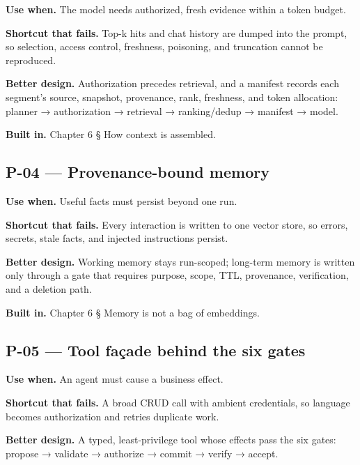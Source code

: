 \textbf{Use when.} The model needs authorized, fresh evidence within a token budget.\par

\textbf{Shortcut that fails.} Top-k hits and chat history are dumped into the prompt, so selection, access control, freshness, poisoning, and truncation cannot be reproduced.\par

\textbf{Better design.} Authorization precedes retrieval, and a manifest records each segment's source, snapshot, provenance, rank, freshness, and token allocation: planner → authorization → retrieval → ranking/dedup → manifest → model.\par

\textbf{Built in.} Chapter 6 § How context is assembled.\par

\subsection{P-04 — Provenance-bound memory}

\textbf{Use when.} Useful facts must persist beyond one run.\par

\textbf{Shortcut that fails.} Every interaction is written to one vector store, so errors, secrets, stale facts, and injected instructions persist.\par

\textbf{Better design.} Working memory stays run-scoped; long-term memory is written only through a gate that requires purpose, scope, TTL, provenance, verification, and a deletion path.\par

\textbf{Built in.} Chapter 6 § Memory is not a bag of embeddings.\par

\subsection{P-05 — Tool façade behind the six gates}

\textbf{Use when.} An agent must cause a business effect.\par

\textbf{Shortcut that fails.} A broad CRUD call with ambient credentials, so language becomes authorization and retries duplicate work.\par

\textbf{Better design.} A typed, least-privilege tool whose effects pass the six gates: propose → validate → authorize → commit → verify → accept.\par

